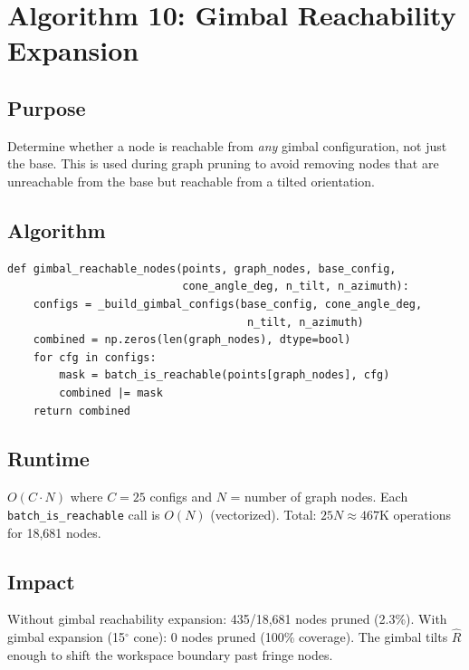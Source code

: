 \documentclass[11pt,a4paper]{article}
\newcommand{\Oh}[1]{$O(#1)$}
\newcommand{\funcname}[1]{\texttt{\textcolor{codepurple}{#1}}}
\begin{document}
\section{Algorithm 10: Gimbal Reachability Expansion}
\label{sec:gimbal_reach}

\subsection{Purpose}

Determine whether a node is reachable from \emph{any} gimbal configuration, not just the base. This is used during graph pruning to avoid removing nodes that are unreachable from the base but reachable from a tilted orientation.

\subsection{Algorithm}

\begin{lstlisting}
def gimbal_reachable_nodes(points, graph_nodes, base_config,
                           cone_angle_deg, n_tilt, n_azimuth):
    configs = _build_gimbal_configs(base_config, cone_angle_deg,
                                     n_tilt, n_azimuth)
    combined = np.zeros(len(graph_nodes), dtype=bool)
    for cfg in configs:
        mask = batch_is_reachable(points[graph_nodes], cfg)
        combined |= mask
    return combined
\end{lstlisting}

\subsection{Runtime}

\Oh{C \cdot N} where $C = 25$ configs and $N$ = number of graph nodes. Each \funcname{batch\_is\_reachable} call is \Oh{N} (vectorized). Total: $25N \approx 467$K operations for 18,681 nodes.

\subsection{Impact}

Without gimbal reachability expansion: 435/18,681 nodes pruned (2.3\%). With gimbal expansion (15$^\circ$ cone): 0 nodes pruned (100\% coverage). The gimbal tilts $\hat{R}$ enough to shift the workspace boundary past fringe nodes.
\end{document}
